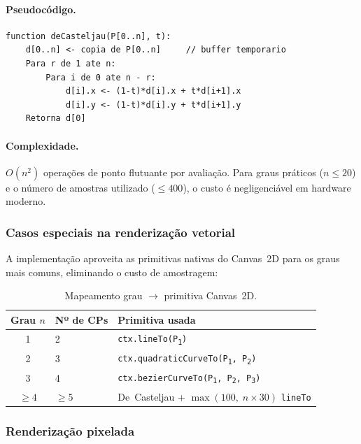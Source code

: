 \documentclass[12pt, a4paper]{article}
\theoremstyle{remark}
\newcommand{\code}[1]{\texttt{#1}}
\begin{document}
\paragraph{Pseudocódigo.}

\begin{lstlisting}[language=Pseudocode, caption={De Casteljau, avaliação de $\mathbf{B}(t)$.}]
function deCasteljau(P[0..n], t):
    d[0..n] <- copia de P[0..n]     // buffer temporario
    Para r de 1 ate n:
        Para i de 0 ate n - r:
            d[i].x <- (1-t)*d[i].x + t*d[i+1].x
            d[i].y <- (1-t)*d[i].y + t*d[i+1].y
    Retorna d[0]
\end{lstlisting}

\paragraph{Complexidade.}
$O(n^2)$ operações de ponto flutuante por avaliação. Para graus práticos
($n \leq 20$) e o número de amostras utilizado ($\leq 400$), o custo é
negligenciável em hardware moderno.

\subsubsection{Casos especiais na renderização vetorial}

A implementação aproveita as primitivas nativas do Canvas~2D para os graus
mais comuns, eliminando o custo de amostragem:

\begin{table}[H]
\centering
\begin{tabular}{cll}
\toprule
\textbf{Grau $n$} & \textbf{Nº de CPs} & \textbf{Primitiva usada} \\
\midrule
1 & 2 & \code{ctx.lineTo(P\textsubscript{1})} \\
2 & 3 & \code{ctx.quadraticCurveTo(P\textsubscript{1}, P\textsubscript{2})} \\
3 & 4 & \code{ctx.bezierCurveTo(P\textsubscript{1}, P\textsubscript{2}, P\textsubscript{3})} \\
$\geq 4$ & $\geq 5$ & De~Casteljau + $\max(100,\;n \times 30)$ \code{lineTo} \\
\bottomrule
\end{tabular}
\caption{Mapeamento grau $\to$ primitiva Canvas~2D.}
\end{table}

\subsubsection{Renderização pixelada}
\end{document}
